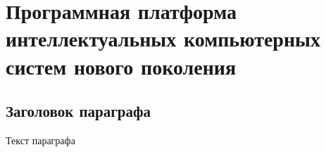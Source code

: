 \chapter{Программная платформа интеллектуальных компьютерных систем нового поколения}
\label{chapter_soft_platform}


\section{Заголовок параграфа}
Текст параграфа

%